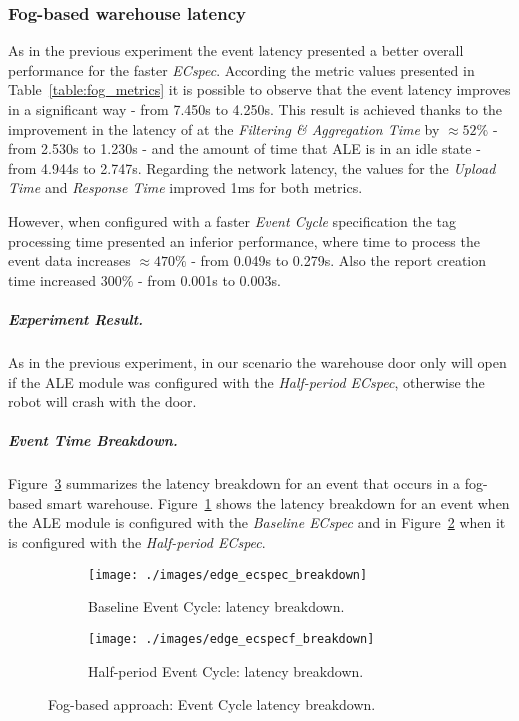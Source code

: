 \subsubsection{Fog-based warehouse latency}
\label{subs:eval_exp_latency_ecspec}
As in the previous experiment the event latency presented a better overall performance for the
faster \textit{ECspec}. According the metric values presented in Table~\ref{table:fog_metrics} it is
possible to observe that the event latency improves in a significant way - from 7.450s to 4.250s. This
result is achieved thanks to the improvement in the latency of at the \textit{Filtering \& Aggregation Time}
by $\approx52\%$ - from 2.530s to 1.230s - and the amount of time that \gls{ALE} is in an idle state -
from 4.944s to 2.747s. Regarding the network latency, the values for the \textit{Upload Time}
and \textit{Response Time} improved 1ms for both metrics.



However, when configured with a faster \textit{Event Cycle} specification the tag processing time
presented an inferior performance, where time to process the event data increases $\approx470\%$
- from 0.049s to 0.279s. Also the report creation time increased $300\%$ - from 0.001s to 0.003s.

\subparagraph{Experiment Result.}
\label{subp:fog_experiment_result}
As in the previous experiment, in our scenario the warehouse door only will open if the \gls{ALE}
module was configured with the \textit{Half-period ECspec}, otherwise the robot will crash with
the door.

\subparagraph{Event Time Breakdown.}
\label{subp:fog_event_breakdown}
Figure~\ref{fig:ecspec_breakdown} summarizes the latency breakdown for an event that occurs in a fog-based
smart warehouse. Figure~\ref{fig:ecspec_base} shows the latency breakdown for an event when the
\gls{ALE} module is configured with the \textit{Baseline ECspec} and in Figure~\ref{fig:ecspec_half}
when it is configured with the \textit{Half-period ECspec}.\\

\begin{figure}[ht!]
 \centering
 \begin{subfigure}{.5\textwidth}
   \centering
   \texttt{[image: ./images/edge\_ecspec\_breakdown]}
   \caption{Baseline Event Cycle: latency breakdown.}
   \label{fig:ecspec_base}
 \end{subfigure}%
 \begin{subfigure}{.5\textwidth}
   \centering
   \texttt{[image: ./images/edge\_ecspecf\_breakdown]}
   \caption{Half-period Event Cycle: latency breakdown.}
   \label{fig:ecspec_half}
 \end{subfigure}
 \caption[Fog-based approach: event latency breakdown.]{Fog-based approach: Event Cycle latency breakdown.}
 \label{fig:ecspec_breakdown}
\end{figure}

